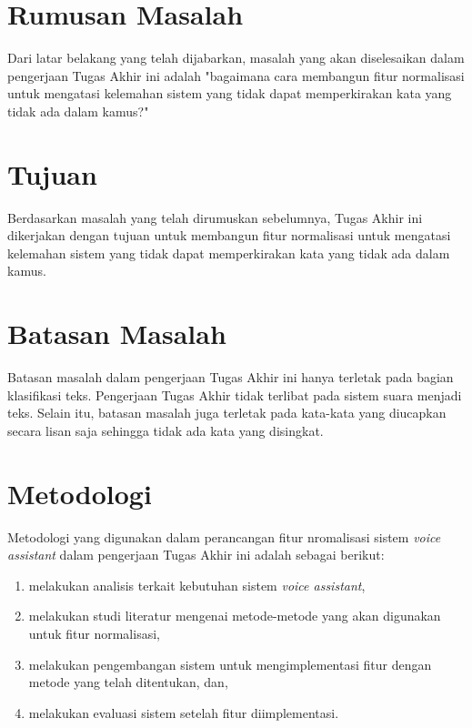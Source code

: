 \section{Rumusan Masalah}

Dari latar belakang yang telah dijabarkan, masalah yang akan diselesaikan dalam pengerjaan Tugas Akhir ini adalah "bagaimana cara membangun fitur normalisasi untuk mengatasi kelemahan sistem yang tidak dapat memperkirakan kata yang tidak ada dalam kamus?"

\section{Tujuan}

Berdasarkan masalah yang telah dirumuskan sebelumnya, Tugas Akhir ini dikerjakan dengan tujuan untuk membangun fitur normalisasi untuk mengatasi kelemahan sistem yang tidak dapat memperkirakan kata yang tidak ada dalam kamus.

\section{Batasan Masalah}

Batasan masalah dalam pengerjaan Tugas Akhir ini hanya terletak pada bagian klasifikasi teks. Pengerjaan Tugas Akhir tidak terlibat pada sistem suara menjadi teks. Selain itu, batasan masalah juga terletak pada kata-kata yang diucapkan secara lisan saja sehingga tidak ada kata yang disingkat.

\section{Metodologi}

Metodologi yang digunakan dalam perancangan fitur nromalisasi sistem \textit{voice assistant} dalam pengerjaan Tugas Akhir ini adalah sebagai berikut:

\begin{enumerate}
	\item melakukan analisis terkait kebutuhan sistem \textit{voice assistant},
	\item melakukan studi literatur mengenai metode-metode yang akan digunakan untuk fitur normalisasi,
	\item melakukan pengembangan sistem untuk mengimplementasi fitur dengan metode yang telah ditentukan, dan,
	\item melakukan evaluasi sistem setelah fitur diimplementasi. 
\end{enumerate}

